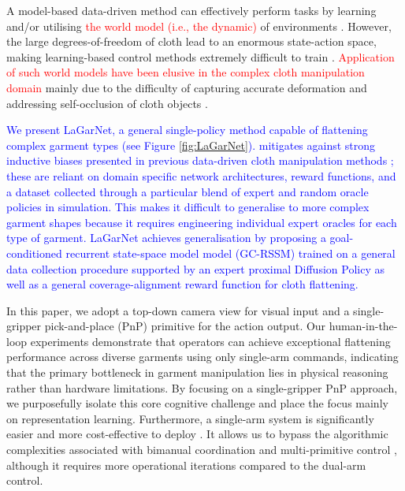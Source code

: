 \documentclass[journal]{IEEEtran}
\newcommand{\addadvantage}[1]{\textcolor{blue}{#1}}
\newcommand{\addinfo}[1]{\textcolor{myPurple}{#1}}
\newcommand{\addIncrementalg}[1]{\textcolor{mygreen}{#1}}
\newcommand{\addtypo}[1]{\textcolor{red}{#1}}
\begin{document}
A model-based data-driven method can effectively perform tasks by learning and/or utilising \addtypo{the world model (i.e., the dynamic)} of environments \cite{ha2018world, hafner2019learning,hafner2020dream, deng2023facing}. \addIncrementalg{However, the large degrees-of-freedom of cloth lead to an enormous state-action space, making learning-based control methods extremely difficult to train \cite{kadi2023data}.} \addtypo{Application of such world models have been elusive in the complex cloth manipulation domain} mainly due to the difficulty of capturing accurate deformation and addressing self-occlusion of cloth objects \cite{ma2021learning,yan2021learning,lin2020softgym}. 

\addadvantage{We present LaGarNet, a general single-policy method capable of flattening  complex garment types (see Figure \ref{fig:LaGarNet}). \text{It} mitigates against strong inductive biases presented in previous data-driven cloth manipulation methods \cite{kadi2025draper, weng2022fabricflownet, hoque2022visuospatial}; these are reliant on domain specific network architectures, reward functions, and a dataset collected through a particular blend of expert and random oracle policies in simulation. This makes it difficult to generalise to more complex garment shapes because it requires engineering individual expert oracles for each type of garment. LaGarNet achieves generalisation by proposing a goal-conditioned recurrent state-space model model (GC-RSSM)  trained on a general data collection procedure supported by an expert proximal Diffusion Policy \text{\cite{chi2023diffusionpolicy}} as well as a general coverage-alignment reward function for cloth flattening. }

\addinfo{In this paper, we adopt a top-down camera view for visual input and a single-gripper pick-and-place (PnP) primitive for the action output. Our human-in-the-loop experiments demonstrate that operators can achieve exceptional flattening performance across diverse garments using only single-arm commands, indicating that the primary bottleneck in garment manipulation lies in physical reasoning rather than hardware limitations. By focusing on a single-gripper PnP approach, we purposefully isolate this core cognitive challenge and place the focus mainly on representation learning. Furthermore, a single-arm system is significantly easier and more cost-effective to deploy \cite{ha2022flingbot, avigal2022speedfolding}. It allows us to bypass the algorithmic complexities associated with bimanual coordination and multi-primitive control \cite{canberk2023cloth}, although it requires more operational iterations compared to the dual-arm control.}
\end{document}
